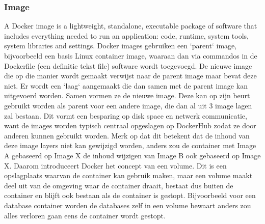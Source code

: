\subsubsection{Image}
A Docker image is a lightweight, standalone, executable package of software that includes everything needed to run an application: code, runtime, system tools, system libraries and settings.\autocite{Docker2023a}
\newline
\newline
Docker images gebruiken een `parent` image, bijvoorbeeld een basis Linux container image, waaraan dan via commandos in de Dockerfile (een definitie tekst file) software wordt toegevoegd. De nieuwe image die op die manier wordt gemaakt verwijst naar de parent image maar bevat deze niet. Er wordt een `laag` aangemaakt die dan samen met de parent image kan uitgevoerd worden. Samen vormen ze de nieuwe image.
Deze kan op zijn beurt gebruikt worden als parent voor een andere image, die dan al uit 3 image lagen zal bestaan. Dit vormt een besparing op disk space en netwerk communicatie, want de images worden typisch centraal opgeslagen op DockerHub zodat ze door anderen kunnen gebruikt worden.
Merk op dat dit betekent dat de inhoud van deze image layers niet kan gewijzigd worden, anders zou de container met Image A gebaseerd op Image X de inhoud wijzigen van Image B ook gebaseerd op Image X. Daarom introduceert Docker het concept van een volume. Dit is een opslagplaats waarvan de container kan gebruik maken, maar een volume maakt deel uit van de omgeving waar de container draait, bestaat dus buiten de container en blijft ook bestaan als de container is gestopt. Bijvoorbeeld voor een database container worden de databases zelf in een volume bewaart anders zou alles verloren gaan eens de container wordt gestopt.

